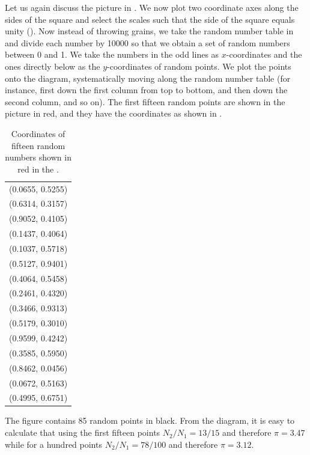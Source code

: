  Let us again discuss the picture in . We now plot two coordinate axes along the sides of the square and select the scales such that the side of the square equals unity (). Now instead of throwing grains, we take the random number table in  and divide each number by \num{10000} so that we obtain a set of random numbers between 0 and 1. We take the numbers in the odd lines as $x$-coordinates and the ones directly below as the $y$-coordinates of random points. We plot the points onto the diagram, systematically
moving along the random number table (for instance, first down the first
column from top to bottom, and then down the second column, and so
on). The first fifteen random points are shown in the picture in red, and
they have the coordinates as shown in .%
\begin{table}
\centering
\begin{smaller}
\begin{tabular}{l}
(0.0655, 0.5255) \\
 (0.6314, 0.3157) \\
  (0.9052, 0.4105) \\
(0.1437, 0.4064) \\
 (0.1037, 0.5718) \\
  (0.5127, 0.9401) \\
(0.4064, 0.5458) \\ 
(0.2461, 0.4320) \\ 
(0.3466, 0.9313) \\ 
(0.5179, 0.3010) \\ 
(0.9599, 0.4242) \\
 (0.3585, 0.5950) \\ 
(0.8462, 0.0456) \\
 (0.0672, 0.5163) \\
  (0.4995, 0.6751) \\
\end{tabular}
\end{smaller}
\caption{Coordinates of fifteen random numbers shown in red in the . \label{random-coord}}
\end{table}
The figure contains 85 random points in black. From
the diagram, it is easy to calculate that using the first fifteen points
$N_{2}/N_{1}= 13/15$ and therefore $\pi = 3.47$ while for a hundred points
$N_{2}/N_{1}= 78/100$ and therefore $\pi = 3.12$.

